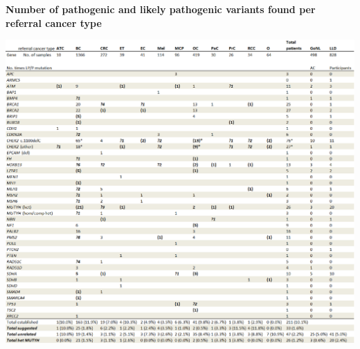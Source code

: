 \begin{table}
	\caption[Number of pathogenic variants found per referral cancer type]{\textbf{Number of pathogenic and likely pathogenic variants found per referral cancer type}}
	\includegraphics[width=1.0\linewidth]{img/opportunistic_screening_Table2}  %

\end{table}
